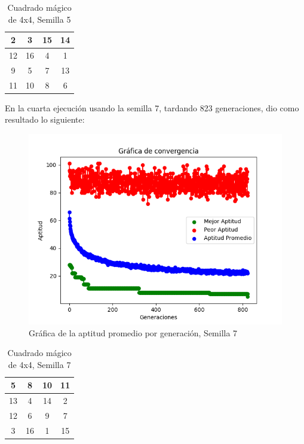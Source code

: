 \documentclass{report}
\begin{document}
    \begin{table}[H]
        \centering
        \begin{tabular}{|c|c|c|c|}
            \hline
            2 & 3 & 15 & 14\\
            \hline
            12 & 16 & 4 & 1\\
            \hline
            9 & 5 & 7 & 13\\
            \hline
            11 & 10 & 8 & 6\\
            \hline
        \end{tabular}
        \caption{Cuadrado mágico de 4x4, Semilla 5}
    \end{table}
    En la cuarta ejecución usando la semilla 7, tardando 823 generaciones, dio como resultado lo siguiente:
    \begin{figure}[H]
        \centering
        \includegraphics[scale=0.5]{Grafica4_2.png}
        \caption{Gráfica de la aptitud promedio por generación, Semilla 7}
    \end{figure}
    \begin{table}[H]
        \centering
        \begin{tabular}{|c|c|c|c|}
            \hline
            5 & 8 & 10 & 11\\
            \hline
            13 & 4 & 14 & 2\\
            \hline
            12 & 6 & 9 & 7\\
            \hline
            3 & 16 & 1 & 15\\
            \hline
        \end{tabular}
        \caption{Cuadrado mágico de 4x4, Semilla 7}
    \end{table}
\end{document}
